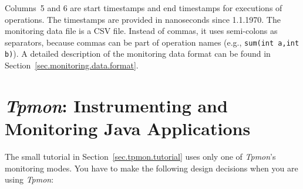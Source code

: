 \documentclass[a4paper,12pt]{scrartcl}
\newcommand{\tpmon}{\textit{Tpmon}}
\begin{document}
Columns~5 and 6 are start timestamps and end timestamps for executions of operations. The timestamps are provided in nanoseconds since 1.1.1970. The monitoring data file is a CSV file. Instead of commas, it uses semi-colons as separators, because commas can be part of operation names (e.g., \texttt{sum(int a,int b)}). A detailed description of the monitoring data format can be found in Section~\ref{sec.monitoring.data.format}.

\section{\textit{Tpmon}: Instrumenting and Monitoring Java Applications}\label{sec.tpmon}

The small tutorial in Section~\ref{sec.tpmon.tutorial} uses only one of \tpmon's monitoring modes. You have to make the following design decisions when you are using \tpmon:
\end{document}
